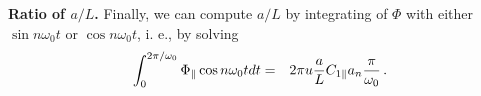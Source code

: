 \documentclass[twocolumn]{aastex62}
\def\m{\begin{eqnarray}}
\def\n{\end{eqnarray}}
\begin{document}
 {\bf{Ratio of $a/L$.}} Finally, we can compute $a/L$ by  integrating of $\Phi$ with either $\sin{n \omega_0 t}$ or $\cos{n \omega_0 t}$, i. e., by solving
 \m
 \int^{2\pi/\omega_0}_{0}\Phi_{\parallel} \cos{n \omega_0 t} dt&=&2 \pi u {a\over L} C_{1 \parallel} a_n {\pi\over \omega_0}\,.
 \n










\end{document}
